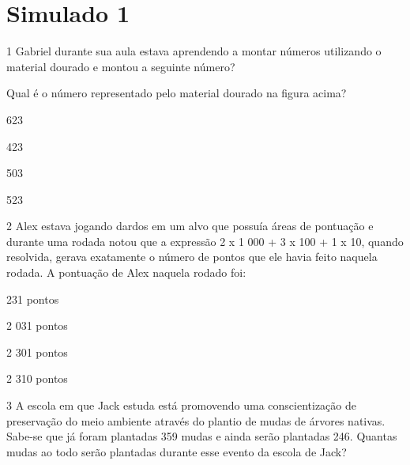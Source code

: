 
\chapter{Simulado 1}

\num{1} Gabriel durante sua aula estava aprendendo a montar números
utilizando o material dourado e montou a seguinte número?


Qual é o número representado pelo material dourado na figura acima?

\begin{escolha}
\item
  623
\item
  423
\item
  503
\item
  523
\end{escolha}


\num{2} Alex estava jogando dardos em um alvo que possuía áreas de
pontuação e durante uma rodada notou que a expressão 2 x 1 000 + 3 x 100
+ 1 x 10, quando resolvida, gerava exatamente o número de pontos que ele
havia feito naquela rodada. A pontuação de Alex naquela rodado foi:

\begin{escolha}
\item
  231 pontos
\item
  2 031 pontos
\item
  2 301 pontos
\item
  2 310 pontos
\end{escolha}


\num{3} A escola em que Jack estuda está promovendo uma conscientização de
preservação do meio ambiente através do plantio de mudas de árvores
nativas. Sabe-se que já foram plantadas 359 mudas e ainda serão
plantadas 246. Quantas mudas ao todo serão plantadas durante esse evento
da escola de Jack?

